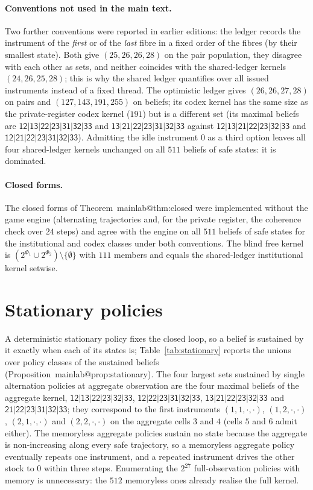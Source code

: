 \documentclass[11pt,a4paper]{article}
\makeatletter
\theoremstyle{plain}
\theoremstyle{definition}
\theoremstyle{remark}
\newcommand{\st}[1]{\mathsf{#1}}
\newcommand{\mref}[1]{\csname mainlab@#1\endcsname}
\makeatother
\begin{document}
\paragraph{Conventions not used in the main text.}
Two further conventions were reported in earlier editions: the ledger records the instrument of the \emph{first} or of the \emph{last} fibre in a fixed order of the fibres (by their smallest state). Both give $(25,26,26,28)$ on the pair population, they disagree with each other as sets, and neither coincides with the shared-ledger kernels $(24,26,25,28)$; this is why the shared ledger quantifies over all issued instruments instead of a fixed thread. The optimistic ledger gives $(26,26,27,28)$ on pairs and $(127,143,191,255)$ on beliefs; its codex kernel has the same size as the private-register codex kernel ($191$) but is a different set (its maximal beliefs are $\st{12|13|22|23|31|32|33}$ and $\st{13|21|22|23|31|32|33}$ against $\st{12|13|21|22|23|32|33}$ and $\st{12|21|22|23|31|32|33}$). Admitting the idle instrument $0$ as a third option leaves all four shared-ledger kernels unchanged on all $511$ beliefs of safe states: it is dominated.

\paragraph{Closed forms.}
The closed forms of Theorem~\mref{thm:closed} were implemented without the game engine (alternating trajectories and, for the private register, the coherence check over $24$ steps) and agree with the engine on all $511$ beliefs of safe states for the institutional and codex classes under both conventions. The blind free kernel is $(2^{\Phi_1}\cup 2^{\Phi_2})\setminus\{\emptyset\}$ with $111$ members and equals the shared-ledger institutional kernel setwise.
\section{Stationary policies}\label{si:stationary}

A deterministic stationary policy fixes the closed loop, so a belief is sustained by it exactly when each of its states is; Table~\ref{tab:stationary} reports the unions over policy classes of the sustained beliefs (Proposition~\mref{prop:stationary}). The four largest sets sustained by single alternation policies at aggregate observation are the four maximal beliefs of the aggregate kernel, $\st{12|13|22|23|32|33}$, $\st{12|22|23|31|32|33}$, $\st{13|21|22|23|32|33}$ and $\st{21|22|23|31|32|33}$; they correspond to the first instruments $(1,1,\cdot,\cdot)$, $(1,2,\cdot,\cdot)$, $(2,1,\cdot,\cdot)$ and $(2,2,\cdot,\cdot)$ on the aggregate cells $3$ and $4$ (cells $5$ and $6$ admit either). The memoryless aggregate policies sustain no state because the aggregate is non-increasing along every safe trajectory, so a memoryless aggregate policy eventually repeats one instrument, and a repeated instrument drives the other stock to $0$ within three steps. Enumerating the $2^{27}$ full-observation policies with memory is unnecessary: the $512$ memoryless ones already realise the full kernel.
\end{document}
